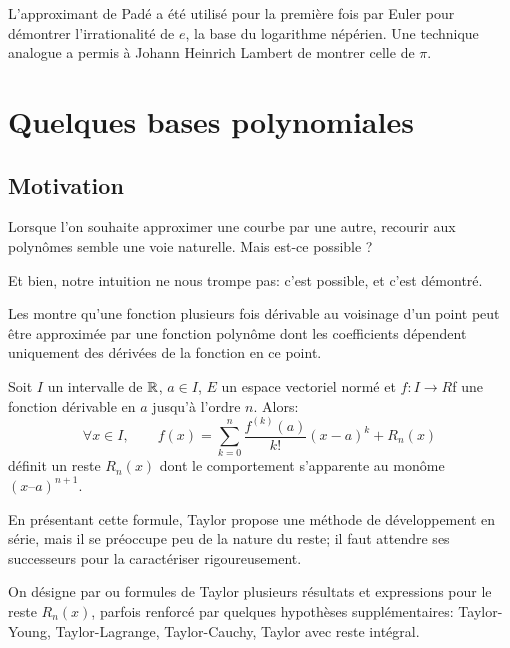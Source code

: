 L'approximant de Padé a été utilisé pour la première fois par Euler 
pour démontrer l'irrationalité de $e$, la base du logarithme népérien. 
Une technique analogue a permis à Johann Heinrich Lambert 
de montrer celle de $\pi$.%







\medskip
\section{Quelques bases polynomiales}

\medskip
\subsection{Motivation}

Lorsque l'on souhaite approximer une courbe par une autre, recourir aux polynômes semble
une voie naturelle.
Mais est-ce possible ?

\medskip
Et bien, notre intuition ne nous trompe pas: c'est possible, et c'est démontré.

Les 
montre qu'une fonction plusieurs fois dérivable au voisinage d'un point peut être approximée 
par une fonction polynôme dont les coefficients dépendent uniquement des dérivées de la fonction 
en ce point.

\begin{theoreme}
Soit $I$ un intervalle de $\mathbb R$, $a\in I$, $E$ un espace vectoriel normé et $f: I\rightarrow R$f une fonction dérivable en $a$ 
jusqu’à l’ordre $n$. Alors:
\begin{equation}
\forall x\in I, \qquad
f(x) =\sum_{k=0}^n \frac{f^{(k)}(a)}{k!}(x-a)^k + R_n(x)
\end{equation}
définit un reste $R_n(x)$ dont le comportement s’apparente au monôme $(x – a)^{n + 1}$.
\end{theoreme}

En présentant cette formule, Taylor propose une méthode de développement en série, mais il se préoccupe peu de la 
nature du reste; il faut attendre ses successeurs pour la caractériser rigoureusement.

On désigne par  ou formules de Taylor plusieurs résultats et expressions pour le reste $R_n(x)$, 
parfois renforcé par quelques hypothèses supplémentaires: 
Taylor-Young,
Taylor-Lagrange,
Taylor-Cauchy,
Taylor avec reste intégral.

